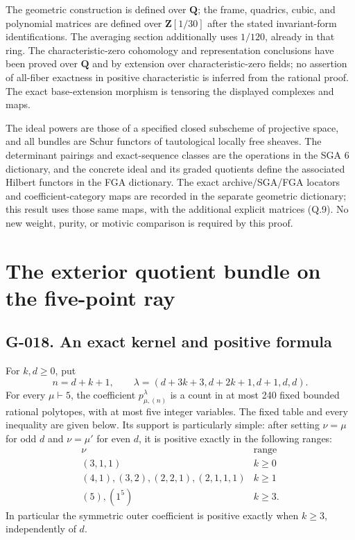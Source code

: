 \documentclass[
  10pt,
]{article}
\begin{document}
The geometric construction is defined over \(\mathbf Q\); the frame,
quadrics, cubic, and polynomial matrices are defined over
\(\mathbf Z[1/30]\) after the stated invariant-form identifications. The
averaging section additionally uses \(1/120\), already in that ring. The
characteristic-zero cohomology and representation conclusions have been
proved over \(\mathbf Q\) and by extension over characteristic-zero
fields; no assertion of all-fiber exactness in positive characteristic
is inferred from the rational proof. The exact base-extension morphism
is tensoring the displayed complexes and maps.

The ideal powers are those of a specified closed subscheme of projective
space, and all bundles are Schur functors of tautological locally free
sheaves. The determinant pairings and exact-sequence classes are the
operations in the SGA 6 dictionary, and the concrete ideal and its
graded quotients define the associated Hilbert functors in the FGA
dictionary. The exact archive/SGA/FGA locators and coefficient-category
maps are recorded in the separate geometric dictionary; this result uses
those same maps, with the additional explicit matrices (Q.9). No new
weight, purity, or motivic comparison is required by this proof.

\section{The exterior quotient bundle on the five-point
ray}\label{the-exterior-quotient-bundle-on-the-five-point-ray}

\subsection{G-018. An exact kernel and positive
formula}\label{g-018.-an-exact-kernel-and-positive-formula}

For \(k,d\ge0\), put \[
n=d+k+1,\qquad
\lambda=(d+3k+3,d+2k+1,d+1,d,d).
\tag{W.1}
\] For every \(\mu\vdash5\), the coefficient \(p_{\mu,(n)}^\lambda\) is
a count in at most 240 fixed bounded rational polytopes, with at most
five integer variables. The fixed table and every inequality are given
below. Its support is particularly simple: after setting \(\nu=\mu\) for
odd \(d\) and \(\nu=\mu'\) for even \(d\), it is positive exactly in the
following ranges: \[
\begin{array}{c|c}
\nu&\text{range}\\\hline
(3,1,1)&k\ge0\\
(4,1),(3,2),(2,2,1),(2,1,1,1)&k\ge1\\
(5),(1^5)&k\ge3.
\end{array}
\tag{W.2}
\] In particular the symmetric outer coefficient is positive exactly
when \(k\ge3\), independently of \(d\).
\end{document}
